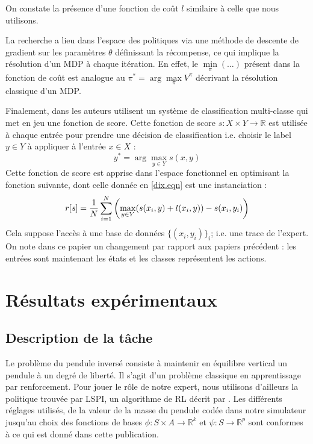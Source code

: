\documentclass[publibook-draft]{CAp2012}
\begin{document}
{   On constate la présence d'une fonction de coût $l$ similaire à celle que nous utilisons.

   La recherche a lieu dans l'espace des politiques via une méthode de descente de gradient sur les paramètres $\theta$ définissant la récompense, ce qui implique la résolution d'un MDP à chaque itération. En effet, le $\min\limits_\pi(\dots)$ présent dans la fonction de coût est analogue au $\pi^* = \arg\max\limits_\pi V^\pi$ décrivant la résolution classique d'un MDP.

   Finalement, dans \citep{ratliff2007imitation} les auteurs utilisent un système de classification multi-classe qui met en jeu une fonction de score. Cette fonction de score $s : X\times Y \rightarrow \mathbb{R}$ est utilisée à chaque entrée pour prendre une décision de classification i.e. choisir le label $y\in Y$ à appliquer à l'entrée $x\in X$ :
   \begin{equation}
   \label{sdef.eqn}
   y^* = \arg\max_{y \in Y} s(x,y)
   \end{equation}
   Cette fonction de score est apprise dans l'espace fonctionnel en optimisant la fonction suivante, dont celle donnée en \ref{dix.eqn} est une instanciation : 
   \begin{equation}
   \label{rdef.eqn}
   r[s] = {1\over N} \sum_{i=1}^N\left(\max_{y\in Y}(s(x_i,y) + l(x_i,y)) - s(x_i,y_i) \right)
   \end{equation}
   Cela suppose l'accès à une base de données $\{(x_i,y_i)\}_i$; i.e. une trace de l'expert. On note dans ce papier un changement par rapport aux papiers précédent : les entrées sont maintenant les états et les classes représentent les actions.

\section{Résultats expérimentaux}
\label{exp.sec}
\subsection{Description de la tâche}
Le problème du pendule inversé consiste à maintenir en équilibre vertical un pendule à un degré de liberté. Il s'agit d'un problème classique en apprentissage par renforcement. Pour jouer le rôle de notre expert, nous utilisons d'ailleurs la politique trouvée par LSPI, un algorithme de RL décrit par \citet{lagoudakis2003least}. Les différents réglages utilisés, de la valeur de la masse du pendule codée dans notre simulateur jusqu'au choix des fonctions de bases $\phi : S\times A \rightarrow \mathbb{R}^k$ et $\psi : S \rightarrow \mathbb{R}^p$ sont conformes à ce qui est donné dans cette publication.\\

}
\end{document}
